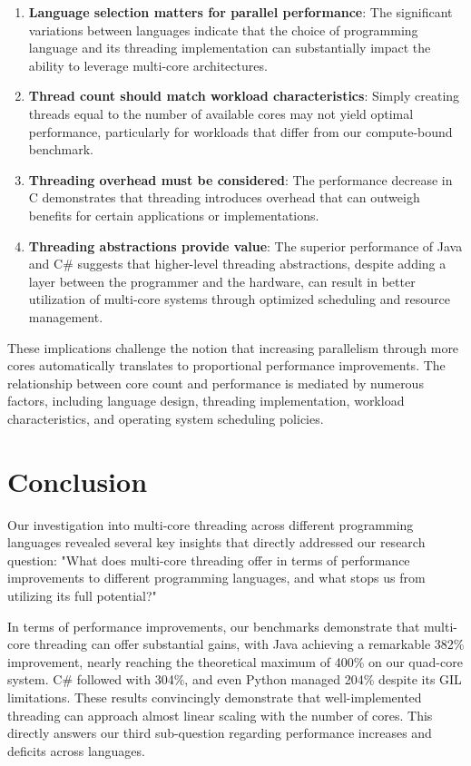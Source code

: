 \documentclass[12pt,a4paper]{article}
\begin{document}
\begin{enumerate}
    \item \textbf{Language selection matters for parallel performance}: The significant variations between languages indicate that the choice of programming language and its threading implementation can substantially impact the ability to leverage multi-core architectures.
    
    \item \textbf{Thread count should match workload characteristics}: Simply creating threads equal to the number of available cores may not yield optimal performance, particularly for workloads that differ from our compute-bound benchmark.
    
    \item \textbf{Threading overhead must be considered}: The performance decrease in C demonstrates that threading introduces overhead that can outweigh benefits for certain applications or implementations.
    
    \item \textbf{Threading abstractions provide value}: The superior performance of Java and C\# suggests that higher-level threading abstractions, despite adding a layer between the programmer and the hardware, can result in better utilization of multi-core systems through optimized scheduling and resource management.
\end{enumerate}

These implications challenge the notion that increasing parallelism through more cores automatically translates to proportional performance improvements. The relationship between core count and performance is mediated by numerous factors, including language design, threading implementation, workload characteristics, and operating system scheduling policies.

\section{Conclusion}

Our investigation into multi-core threading across different programming languages revealed several key insights that directly addressed our research question: "What does multi-core threading offer in terms of performance improvements to different programming languages, and what stops us from utilizing its full potential?"

In terms of performance improvements, our benchmarks demonstrate that multi-core threading can offer substantial gains, with Java achieving a remarkable 382\% improvement, nearly reaching the theoretical maximum of 400\% on our quad-core system. C\# followed with 304\%, and even Python managed 204\% despite its GIL limitations. These results convincingly demonstrate that well-implemented threading can approach almost linear scaling with the number of cores. This directly answers our third sub-question regarding performance increases and deficits across languages.
\end{document}
